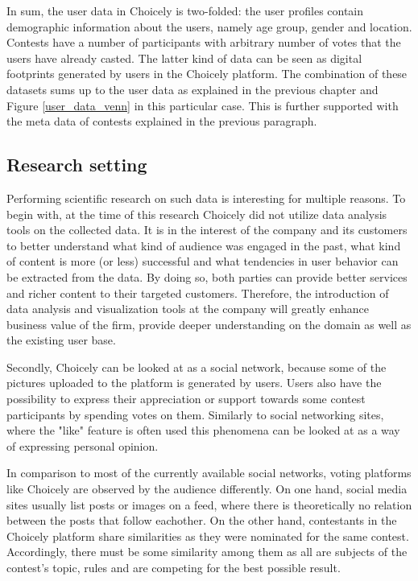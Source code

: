 In sum, the user data in Choicely is two-folded: the user profiles contain demographic information about the users, namely age group, gender and location. Contests have a number of participants with arbitrary number of votes that the users have already casted. The latter kind of data can be seen as digital footprints generated by users in the Choicely platform. The combination of these datasets sums up to the user data as explained in the previous chapter and Figure \ref{user_data_venn} in this particular case. This is further supported with the meta data of contests explained in the previous paragraph. 

\subsection{Research setting}
    Performing scientific research on such data is interesting for multiple reasons. To begin with, at the time of this research Choicely did not utilize data analysis tools on the collected data. It is in the interest of the company and its customers to better understand what kind of audience was engaged in the past, what kind of content is more (or less) successful and what tendencies in user behavior can be extracted from the data. By doing so, both parties can provide better services and richer content to their targeted customers. Therefore, the introduction of data analysis and visualization tools at the company will greatly enhance business value of the firm, provide deeper understanding on the domain as well as the existing user base.   
    
    Secondly, Choicely can be looked at as a social network, because some of the pictures uploaded to the platform is generated by users. Users also have the possibility to express their appreciation or support towards some contest participants by spending votes on them. Similarly to social networking sites, where the "like" feature is often used \cite{jang2015noreciprocity, bakhshi2014faces} this phenomena can be looked at as a way of expressing personal opinion. 
    
    In comparison to most of the currently available social networks, voting platforms like Choicely are observed by the audience differently. On one hand, social media sites usually list posts or images on a feed, where there is theoretically no relation between the posts that follow eachother. %
    On the other hand, contestants in the Choicely platform share similarities as they were nominated for the same contest. Accordingly, there must be some similarity among them as all are subjects of the contest's topic, rules and are competing for the best possible result. 

